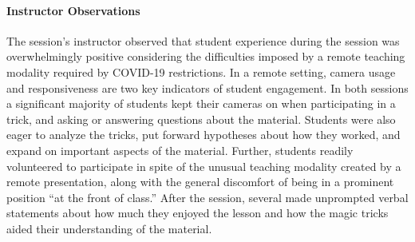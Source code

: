 \paragraph{Instructor Observations}
The session's instructor observed that student experience during
the session was overwhelmingly positive considering
the difficulties imposed by a remote teaching modality required by COVID-19
restrictions.
In a remote setting, camera usage
and responsiveness are two key indicators of student engagement.
In both sessions a significant majority of students kept their cameras on
when participating in a trick, and asking or answering questions
about the material.
Students were also
eager to analyze the
tricks, put forward hypotheses about how they worked,
and expand on important aspects of the material.
Further, students readily volunteered to participate in spite
of the unusual teaching modality created by a remote presentation,
along with the general discomfort of being in a
prominent position ``at the front of class.''
After the session,
several
made
unprompted verbal statements about how much they enjoyed the
lesson and how the magic tricks aided their understanding of the
material.
